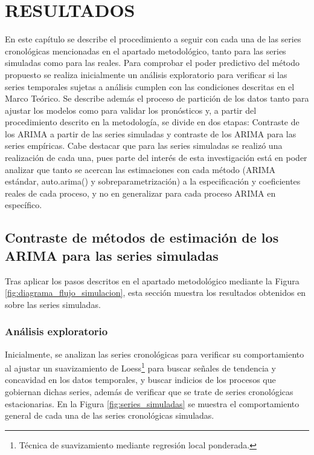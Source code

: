 \documentclass[
]{article}
\begin{document}
\newpage

\section{RESULTADOS} 


\label{chap:resultados}

En este capítulo se describe el procedimiento a seguir con cada una de
las series cronológicas mencionadas en el apartado metodológico, tanto
para las series simuladas como para las reales. Para comprobar el poder
predictivo del método propuesto se realiza inicialmente un análisis
exploratorio para verificar si las series temporales sujetas a análisis
cumplen con las condiciones descritas en el Marco Teórico. Se describe
además el proceso de partición de los datos tanto para ajustar los
modelos como para validar los pronósticos y, a partir del procedimiento
descrito en la metodología, se divide en dos etapas: Contraste de los
ARIMA a partir de las series simuladas y contraste de los ARIMA para las
series empíricas. Cabe destacar que para las series simuladas se realizó
una realización de cada una, pues parte del interés de esta
investigación está en poder analizar que tanto se acercan las
estimaciones con cada método (ARIMA estándar, auto.arima() y
sobreparametrización) a la especificación y coeficientes reales de cada
proceso, y no en generalizar para cada proceso ARIMA en específico.

\subsection{Contraste de métodos de estimación de los ARIMA para las series simuladas}

Tras aplicar los pasos descritos en el apartado metodológico mediante la
Figura \ref{fig:diagrama_flujo_simulacion}, esta sección muestra los
resultados obtenidos en sobre las series simuladas.

\subsubsection{Análisis exploratorio}

Inicialmente, se analizan las series cronológicas para verificar su
comportamiento al ajustar un suavizamiento de Loess\footnote{Técnica de
  suavizamiento mediante regresión local ponderada.} para buscar señales
de tendencia y concavidad en los datos temporales, y buscar indicios de
los procesos que gobiernan dichas series, además de verificar que se
trate de series cronológicas estacionarias. En la Figura
\ref{fig:series_simuladas} se muestra el comportamiento general de cada
una de las series cronológicas simuladas.
\end{document}
